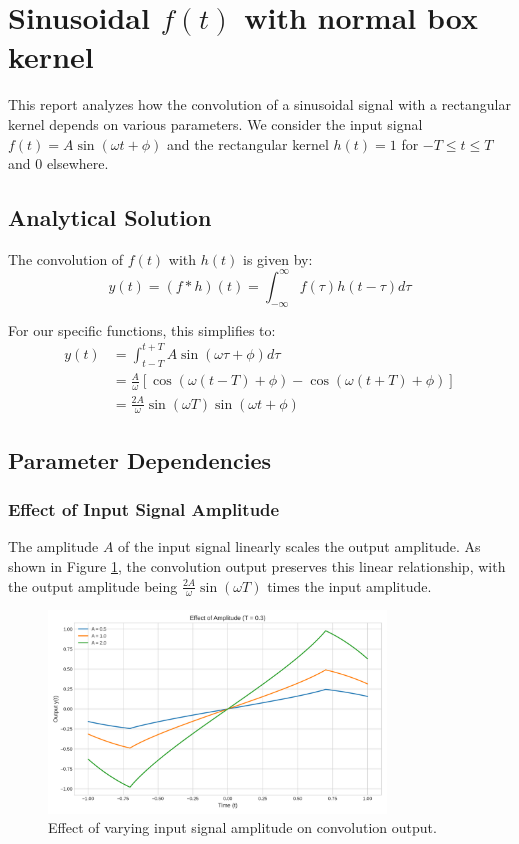 \section{Sinusoidal $f(t)$ with normal box kernel}
This report analyzes how the convolution of a sinusoidal signal with a rectangular kernel depends on various parameters. We consider the input signal $f(t) = A\sin(\omega t + \phi)$ and the rectangular kernel $h(t) = 1$ for $-T \leq t \leq T$ and 0 elsewhere.

\subsection{Analytical Solution}
The convolution of $f(t)$ with $h(t)$ is given by:
\begin{equation}
y(t) = (f * h)(t) = \int_{-\infty}^{\infty} f(\tau)h(t-\tau)d\tau
\end{equation}

For our specific functions, this simplifies to:
\begin{align}
y(t) &= \int_{t-T}^{t+T} A\sin(\omega\tau + \phi)d\tau\\
&= \frac{A}{\omega}[\cos(\omega(t-T) + \phi) - \cos(\omega(t+T) + \phi)]\\
&= \frac{2A}{\omega}\sin(\omega T)\sin(\omega t + \phi)
\end{align}

\subsection{Parameter Dependencies}

\subsubsection{Effect of Input Signal Amplitude}
The amplitude $A$ of the input signal linearly scales the output amplitude. As shown in Figure \ref{fig:amplitude}, the convolution output preserves this linear relationship, with the output amplitude being $\frac{2A}{\omega}\sin(\omega T)$ times the input amplitude.

\begin{figure}[H]
    \centering
    \includegraphics[width=0.8\textwidth]{codes/codes_sin_1_and_arcsin/figures/amplitude_effect.png}
    \caption{Effect of varying input signal amplitude on convolution output.}
    \label{fig:amplitude}
\end{figure}

